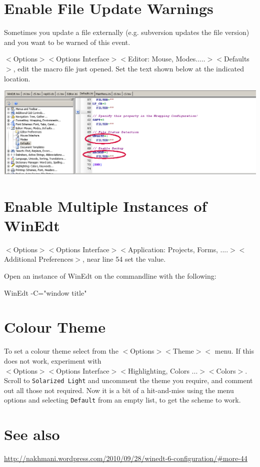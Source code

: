 %





\section{Enable File Update Warnings}

Sometimes you update a file externally (e.g. subversion updates the file version) and you want to be warned of this event.

$<$Options$>$$<$Options Interface$>$$<$Editor: Mouse, Modes.....$>$$<$Defaults$>$, edit the macro file just opened. Set the text shown below at the indicated location.

\centerline{\includegraphics[bb= 0 0 1055 352,width=\textwidth]{eps/updatedrives.png}}




\section{Enable Multiple Instances of WinEdt}



$<$Options$>$$<$Options Interface$>$$<$Application: Projects, Forms, ....$>$$<$Additional Preferences$>$, near line 54 set the value.

Open an instance of WinEdt on the commandline with the following:

WinEdt -C="window title"


\section{Colour Theme}

To set a colour theme select from the 
$<$Options$>$$<$Theme$>$$<$ menu.  If this does not work, experiment with \\
$<$Options$>$$<$Options Interface$>$$<$Highlighting, Colors ...$>$$<$Colors$>$. Scroll to \lstinline{Solarized Light} and uncomment the theme you require, and comment out all those not required.  Now it is a bit of a hit-and-miss using the menu options and selecting \lstinline{Default} from an empty list, to get the scheme to work.


\section{See also}

\url{http://nakhmani.wordpress.com/2010/09/28/winedt-6-configuration/#more-44}


